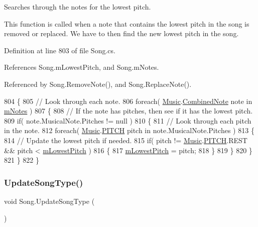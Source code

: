 Searches through the notes for the lowest pitch. 

This function is called when a note that contains the lowest pitch in the song is removed or replaced. We have to then find the new lowest pitch in the song. 

Definition at line 803 of file Song.\+cs.



References Song.\+m\+Lowest\+Pitch, and Song.\+m\+Notes.



Referenced by Song.\+Remove\+Note(), and Song.\+Replace\+Note().


\begin{DoxyCode}
804     \{
805         \textcolor{comment}{// Look through each note.}
806         \textcolor{keywordflow}{foreach}( \hyperlink{class_music}{Music}.\hyperlink{group___music_structs_struct_music_1_1_combined_note}{CombinedNote} note in \hyperlink{group___song_priv_var_ga674bc904a1f856d485d5fb7fe84bac85}{mNotes} )
807         \{
808             \textcolor{comment}{// If the note has pitches, then see if it has the lowest pitch.}
809             \textcolor{keywordflow}{if}( note.MusicalNote.Pitches != null )
810             \{
811                 \textcolor{comment}{// Look through each pitch in the note.}
812                 \textcolor{keywordflow}{foreach}( \hyperlink{class_music}{Music}.\hyperlink{group___music_enums_ga508f69b199ea518f935486c990edac1d}{PITCH} pitch in note.MusicalNote.Pitches )
813                 \{
814                     \textcolor{comment}{// Update the lowest pitch if needed.}
815                     \textcolor{keywordflow}{if}( pitch != \hyperlink{class_music}{Music}.\hyperlink{group___music_enums_ga508f69b199ea518f935486c990edac1d}{PITCH}.REST && pitch < 
      \hyperlink{group___song_priv_var_ga293976ef4c2050687a81edfbf77b4fc1}{mLowestPitch} )
816                     \{
817                         \hyperlink{group___song_priv_var_ga293976ef4c2050687a81edfbf77b4fc1}{mLowestPitch} = pitch;
818                     \}
819                 \}
820             \}
821         \}
822     \}
\end{DoxyCode}
\mbox{\label{group___song_priv_func_ga9a1d6eba1576c3631d3c0331196d9ae2}} 
\subsubsection{\texorpdfstring{Update\+Song\+Type()}{UpdateSongType()}}
{\footnotesize\ttfamily void Song.\+Update\+Song\+Type (\begin{DoxyParamCaption}{ }\end{DoxyParamCaption})\hspace{0.3cm}{\ttfamily [private]}}



